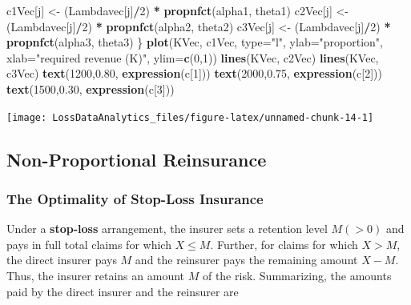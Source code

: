 \documentclass[]{book}
\newenvironment{Shaded}{\begin{snugshade}}{\end{snugshade}}
\newcommand{\KeywordTok}[1]{\textcolor[rgb]{0.13,0.29,0.53}{\textbf{#1}}}
\newcommand{\DataTypeTok}[1]{\textcolor[rgb]{0.13,0.29,0.53}{#1}}
\newcommand{\DecValTok}[1]{\textcolor[rgb]{0.00,0.00,0.81}{#1}}
\newcommand{\FloatTok}[1]{\textcolor[rgb]{0.00,0.00,0.81}{#1}}
\newcommand{\StringTok}[1]{\textcolor[rgb]{0.31,0.60,0.02}{#1}}
\newcommand{\OperatorTok}[1]{\textcolor[rgb]{0.81,0.36,0.00}{\textbf{#1}}}
\newcommand{\NormalTok}[1]{#1}
\theoremstyle{definition}
\theoremstyle{definition}
\theoremstyle{definition}
\theoremstyle{remark}
\begin{document}
\begin{Shaded}
\begin{Highlighting}[]
\NormalTok{  c1Vec[j] <-}\StringTok{ }\NormalTok{(Lambdavec[j]}\OperatorTok{/}\DecValTok{2}\NormalTok{) }\OperatorTok{*}\StringTok{ }\KeywordTok{propnfct}\NormalTok{(alpha1, theta1)}
\NormalTok{  c2Vec[j] <-}\StringTok{ }\NormalTok{(Lambdavec[j]}\OperatorTok{/}\DecValTok{2}\NormalTok{) }\OperatorTok{*}\StringTok{ }\KeywordTok{propnfct}\NormalTok{(alpha2, theta2)}
\NormalTok{  c3Vec[j] <-}\StringTok{ }\NormalTok{(Lambdavec[j]}\OperatorTok{/}\DecValTok{2}\NormalTok{) }\OperatorTok{*}\StringTok{ }\KeywordTok{propnfct}\NormalTok{(alpha3, theta3)}
\NormalTok{  \}}
\KeywordTok{plot}\NormalTok{(KVec, c1Vec, }\DataTypeTok{type=}\StringTok{"l"}\NormalTok{, }\DataTypeTok{ylab=}\StringTok{"proportion"}\NormalTok{, }\DataTypeTok{xlab=}\StringTok{"required revenue (K)"}\NormalTok{, }\DataTypeTok{ylim=}\KeywordTok{c}\NormalTok{(}\DecValTok{0}\NormalTok{,}\DecValTok{1}\NormalTok{))}
\KeywordTok{lines}\NormalTok{(KVec, c2Vec)}
\KeywordTok{lines}\NormalTok{(KVec, c3Vec)}
\KeywordTok{text}\NormalTok{(}\DecValTok{1200}\NormalTok{,}\FloatTok{0.80}\NormalTok{, }\KeywordTok{expression}\NormalTok{(c[}\DecValTok{1}\NormalTok{]))}
\KeywordTok{text}\NormalTok{(}\DecValTok{2000}\NormalTok{,}\FloatTok{0.75}\NormalTok{, }\KeywordTok{expression}\NormalTok{(c[}\DecValTok{2}\NormalTok{]))}
\KeywordTok{text}\NormalTok{(}\DecValTok{1500}\NormalTok{,}\FloatTok{0.30}\NormalTok{, }\KeywordTok{expression}\NormalTok{(c[}\DecValTok{3}\NormalTok{]))}
\end{Highlighting}
\end{Shaded}

\begin{center}\texttt{[image: LossDataAnalytics\_files/figure-latex/unnamed-chunk-14-1]} \end{center}

\subsection{Non-Proportional Reinsurance}\label{S:NonProportionalRe}

\subsubsection{The Optimality of Stop-Loss
Insurance}\label{the-optimality-of-stop-loss-insurance}

Under a \textbf{stop-loss} arrangement, the insurer sets a retention
level \(M (>0)\) and pays in full total claims for which \(X \le M\).
Further, for claims for which \(X > M\), the direct insurer pays \(M\)
and the reinsurer pays the remaining amount \(X-M\). Thus, the insurer
retains an amount \(M\) of the risk. Summarizing, the amounts paid by
the direct insurer and the reinsurer are
\end{document}
